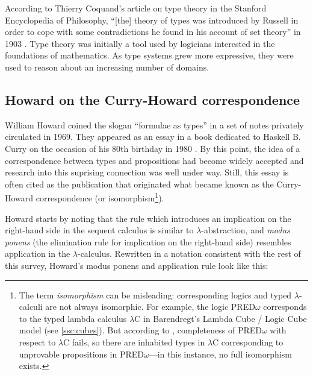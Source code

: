 \documentclass[12pt,toc=bibliography,numbers=noendperiod,
               footnotes=multiple,twoside]{scrartcl}
\begin{document}
According to Thierry Coquand's article on type theory in the Stanford Encyclopedia of Philosophy, \enquote{[the] theory of types was introduced by Russell in order to cope with some contradictions he found in his account of set theory} in 1903 \autocite{coquand_type_2014}. Type theory was initially a tool used by logicians interested in the foundations of mathematics. As type systems grew more expressive, they were used to reason about an increasing number of domains.

\subsection{Howard on the Curry-Howard correspondence}

William Howard coined the slogan \enquote{formulae as types} in a set of notes privately circulated in 1969. They appeared as an essay in a book dedicated to Haskell B. Curry on the occasion of his 80th birthday in 1980 \autocite{howard_formulae-as-types_1980}. By this point, the idea of a correspondence between types and propositions had become widely accepted and research into this suprising connection was well under way. Still, this essay is often cited as the publication that originated what became known as the Curry-Howard correspondence (or isomorphism\footnote{The term \emph{isomorphism} can be misleading: corresponding logics and typed \(\lambda\)-calculi are not always isomorphic. For example, the logic PRED\(\omega\) corresponds to the typed lambda calculus \(\lambda\)C in Barendregt's Lambda Cube / Logic Cube model (see \cref{ssc:cubes}). But according to \textcite{barendregt_lambda_1992}, completeness of PRED\(\omega\) with respect to \(\lambda\)C fails, so there are inhabited types in \(\lambda\)C corresponding to unprovable propositions in PRED\(\omega\)---in this instance, no full isomorphism exists.}).

Howard starts by noting that the rule which introduces an implication on the right-hand side in the sequent calculus is similar to \(\lambda\)-abstraction, and \emph{modus ponens} (the elimination rule for implication on the right-hand side) resembles application in the \(\lambda\)-calculus. Rewritten in a notation consistent with the rest of this survey, Howard's modus ponens and application rule look like this:
\end{document}
